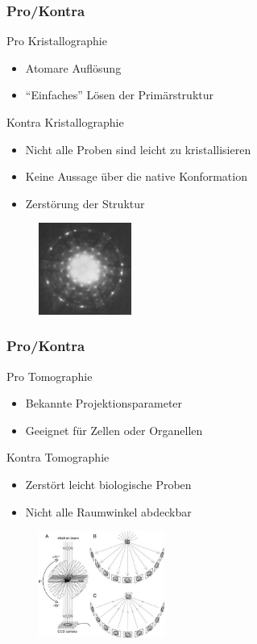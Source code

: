 \begin{frame}
	\frametitle{Pro/Kontra}
	\begin{block}{Pro Kristallographie}
		\begin{itemize}
			\item Atomare Auflösung
			\item "`Einfaches"' Lösen der Primärstruktur
		\end{itemize}
	\end{block}
	\begin{block}{Kontra Kristallographie}
		\begin{itemize}
			\item Nicht alle Proben sind leicht zu kristallisieren
			\item Keine Aussage über die native Konformation
			\item Zerstörung der Struktur
		\end{itemize}
	\end{block}
	\begin{figure}
		\includegraphics[height = 3cm]{pic/kristall.png}
	\end{figure}
\end{frame}

\begin{frame}
	\frametitle{Pro/Kontra}
	\begin{block}{Pro Tomographie}
		\begin{itemize}
			\item Bekannte Projektionsparameter
			\item Geeignet für Zellen oder Organellen
		\end{itemize}
	\end{block}
	\begin{block}{Kontra Tomographie}
		\begin{itemize}
			\item Zerstört leicht biologische Proben
			\item Nicht alle Raumwinkel abdeckbar
		\end{itemize}
	\end{block}
	\begin{figure}
		\includegraphics[height = 3.5cm]{pic/tomography.jpg}
	\end{figure}
\end{frame}